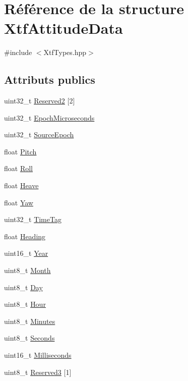 \hypertarget{structXtfAttitudeData}{}\section{Référence de la structure Xtf\+Attitude\+Data}
\label{structXtfAttitudeData}


{\ttfamily \#include $<$Xtf\+Types.\+hpp$>$}

\subsection*{Attributs publics}
\begin{DoxyCompactItemize}
\item 
uint32\+\_\+t \hyperlink{structXtfAttitudeData_a4d7429c51fbd9386ad742862f629bf4d}{Reserved2} \mbox{[}2\mbox{]}
\item 
uint32\+\_\+t \hyperlink{structXtfAttitudeData_ae30d080da0e06e1f781e333790a9bbed}{Epoch\+Microseconds}
\item 
uint32\+\_\+t \hyperlink{structXtfAttitudeData_aba5b0d9369962e937c499352401c0aca}{Source\+Epoch}
\item 
float \hyperlink{structXtfAttitudeData_a187d277443c20add0be09444b09cc346}{Pitch}
\item 
float \hyperlink{structXtfAttitudeData_ad4c9c8aba4035270630b7efd68f23aaa}{Roll}
\item 
float \hyperlink{structXtfAttitudeData_a0c71f93b7bcc063e5ca0e99308e2d8e6}{Heave}
\item 
float \hyperlink{structXtfAttitudeData_a543750e10a76ab1c4ec14b01944ce88b}{Yaw}
\item 
uint32\+\_\+t \hyperlink{structXtfAttitudeData_a6c645e54581fa6862945a61f1b9d5835}{Time\+Tag}
\item 
float \hyperlink{structXtfAttitudeData_a0f8aaa0cd7b5fc2fefc5194ecddb7369}{Heading}
\item 
uint16\+\_\+t \hyperlink{structXtfAttitudeData_a0bc829e938549a56028144b0e333db8f}{Year}
\item 
uint8\+\_\+t \hyperlink{structXtfAttitudeData_af2376b38a8fdd143653be99b0a236a2f}{Month}
\item 
uint8\+\_\+t \hyperlink{structXtfAttitudeData_af456e437ceff9b17d11656ee65aeab3d}{Day}
\item 
uint8\+\_\+t \hyperlink{structXtfAttitudeData_a5e1e347929369bacad93ac79a9ca3cac}{Hour}
\item 
uint8\+\_\+t \hyperlink{structXtfAttitudeData_ad9785a42ff80131ceaa1377dd50331ee}{Minutes}
\item 
uint8\+\_\+t \hyperlink{structXtfAttitudeData_ad2bce9f21b583985ffe27b3b774986bc}{Seconds}
\item 
uint16\+\_\+t \hyperlink{structXtfAttitudeData_af8d8d8ed1210c5de8412199298c21a54}{Milliseconds}
\item 
uint8\+\_\+t \hyperlink{structXtfAttitudeData_a57ce34d53da4342f02a514c02fa46905}{Reserved3} \mbox{[}1\mbox{]}
\end{DoxyCompactItemize}


